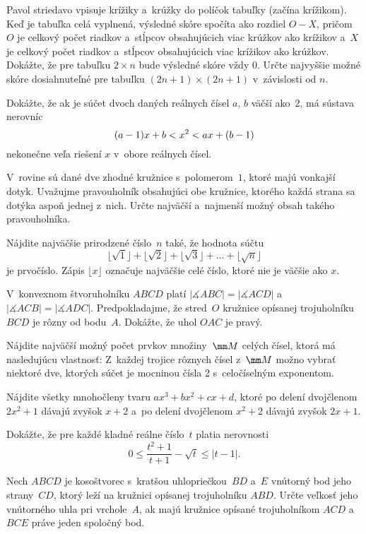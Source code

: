 ﻿{%
Pavol striedavo vpisuje krížiky a~krúžky do políčok tabuľky
(začína krížikom). Keď je tabuľka celá vyplnená, výsledné skóre spočíta ako rozdiel $O-X$, pričom $O$ je celkový počet riadkov a~stĺpcov obsahujúcich viac krúžkov ako krížikov a~$X$ je celkový počet riadkov a~stĺpcov obsahujúcich viac krížikov ako krúžkov.
 Dokážte, že pre tabuľku $2\times n$ bude výsledné skóre vždy 0.
 Určte najvyššie možné skóre dosiahnuteľné pre tabuľku ${(2n+1)}\times {(2n+1)}$ v~závislosti od $n$.\endgraf
}

{%
Dokážte, že ak je súčet dvoch daných reálnych čísel $a$, $b$ väčší
ako~2, má sústava nerovníc
$$
\postdisplaypenalty=10000
(a-1)x+b<x^2<ax+(b-1)
$$
nekonečne veľa riešení $x$ v~obore reálnych čísel.}

{%
V~rovine sú dané dve zhodné kružnice s~polomerom~$1$, ktoré majú vonkajší dotyk. Uvažujme pravouholník obsahujúci obe kružnice, ktorého každá strana sa dotýka aspoň jednej z~nich. Určte najväčší a~najmenší možný obsah takého pravouholníka.}

{%
Nájdite najväčšie prirodzené číslo~$n$ také, že hodnota súčtu
$$\lfloor \sqrt{1} \rfloor + \lfloor \sqrt{2} \rfloor +
\lfloor \sqrt{3} \rfloor
+ \ldots + \lfloor \sqrt{n} \rfloor$$
je prvočíslo.
Zápis $\lfloor x \rfloor$ označuje najväčšie celé číslo, ktoré nie je väčšie ako $x$.}

{%
V~konvexnom štvoruholníku $ABCD$ platí $|\measuredangle ABC| = |\measuredangle ACD|$ a $|\measuredangle ACB| = |\measuredangle ADC|$. Predpokladajme, že stred~$O$ kružnice opísanej trojuholníku $BCD$ je rôzny od bodu~$A$. Dokážte, že uhol $OAC$ je pravý.}

{%
Nájdite najväčší možný počet prvkov množiny~$\mm M$ celých čísel, ktorá má nasledujúcu vlastnosť: Z~každej trojice rôznych čísel z~$\mm M$ možno vybrať niektoré dve, ktorých súčet je mocninou čísla 2 s~celočíselným exponentom.}

{%
Nájdite všetky mnohočleny tvaru $ax^3+bx^2+cx+d$, ktoré po delení dvojčlenom $2x^2+1$ dávajú zvyšok $x+2$ a~po delení dvojčlenom $x^2+2$ dávajú zvyšok $2x+1$.}

{%
Dokážte, že pre každé kladné reálne číslo~$t$ platia nerovnosti
$$0\le \frac{t^2+1}{t+1}-\sqrt t \le |t-1|.$$}

{%
Nech $ABCD$ je kosoštvorec s~kratšou uhlopriečkou~$BD$ a~$E$ vnútorný bod jeho strany~$CD$, ktorý leží na kružnici opísanej trojuholníku $ABD$. Určte veľkosť jeho vnútorného uhla pri vrchole~$A$, ak majú kružnice opísané trojuholníkom $ACD$ a~$BCE$ práve jeden spoločný bod.}

